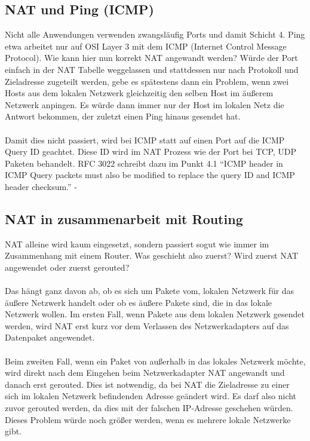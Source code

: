 \subsection{NAT und Ping (ICMP)}
Nicht alle Anwendungen verwenden zwangsläufig Ports und damit Schicht 4. Ping etwa arbeitet nur auf OSI Layer 3 mit dem ICMP (Internet Control Message Protocol). Wie kann hier nun korrekt NAT angewandt werden? Würde der Port einfach in der NAT Tabelle weggelassen und stattdessen nur nach Protokoll und Zieladresse zugeteilt werden, gebe es spätestens dann ein Problem, wenn zwei Hosts aus dem lokalen Netzwerk gleichzeitig den selben Host im äußerem Netzwerk anpingen. Es würde dann immer nur der Host im lokalen Netz die Antwort bekommen, der zuletzt einen Ping hinaus gesendet hat. 
\\\\
Damit dies nicht passiert, wird bei ICMP statt auf einen Port auf die ICMP Query ID geachtet. Diese ID wird im NAT Prozess wie der Port bei TCP, UDP Paketen behandelt. RFC 3022 schreibt dazu im Punkt 4.1 “ICMP header in ICMP Query packets must also be modified to replace the query ID and ICMP header checksum.” - %

\subsection{NAT in zusammenarbeit mit Routing}
NAT alleine wird kaum eingesetzt, sondern passiert sogut wie immer im Zusammenhang mit einem Router. Was geschieht also zuerst? Wird zuerst NAT angewendet oder zuerst gerouted?
\\\\
Das hängt ganz davon ab, ob es sich um Pakete vom, lokalen Netzwerk für das äußere Netzwerk handelt oder ob es äußere Pakete sind, die in das lokale Netzwerk wollen.
Im ersten Fall, wenn Pakete aus dem lokalen Netzwerk gesendet werden, wird NAT erst kurz vor dem Verlassen des Netzwerkadapters auf das Datenpaket angewendet. 
\\\\
Beim zweiten Fall, wenn ein Paket von außerhalb in das lokales Netzwerk möchte, wird direkt nach dem Eingehen beim Netzwerkadapter NAT angewandt und danach erst gerouted. Dies ist notwendig, da bei NAT die Zieladresse zu einer sich im lokalen Netzwerk befindenden Adresse geändert wird. Es darf also nicht zuvor gerouted werden, da dies mit der falschen IP-Adresse geschehen würden. Dieses Problem würde noch größer werden, wenn es mehrere lokale Netzwerke gibt.

